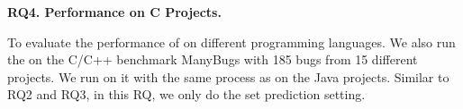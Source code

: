 {\bf RQ4. Performance on C Projects.}

To evaluate the performance of \tool on different programming languages. We also run the \tool on the C/C++ benchmark ManyBugs \cite{manybugs} with 185 bugs from 15 different projects. We run \tool on it with the same process as on the Java projects. Similar to RQ2 and RQ3, in this RQ, we only do the set prediction setting.
